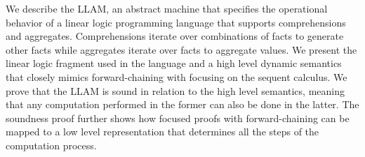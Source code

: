 We describe the LLAM, an abstract machine that specifies the operational
behavior of a linear logic programming language that supports comprehensions
and aggregates. Comprehensions iterate over combinations of facts to generate
other facts while aggregates iterate over facts to aggregate values. We present
the linear logic fragment used in the language and a high level dynamic
semantics that closely mimics forward-chaining with focusing on the sequent
calculus.  We prove that the LLAM is sound in relation to the high level
semantics, meaning that any computation performed in the former can also be done
in the latter. The soundness proof further shows how focused proofs with
forward-chaining can be mapped to a low level representation that determines all
the steps of the computation process.
